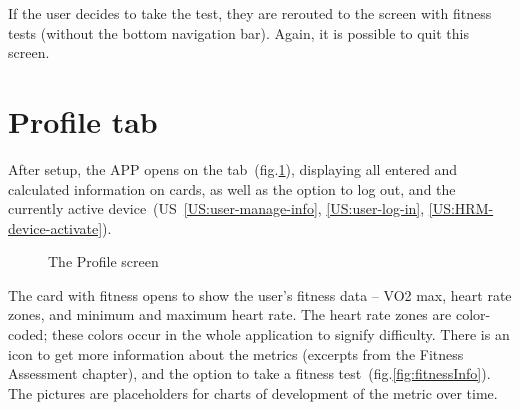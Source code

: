 If the user decides to take the test, they are rerouted to the screen with fitness tests (without the bottom navigation bar).
Again, it is possible to quit this screen.

\section{Profile tab}
After setup, the APP opens on the  tab~(fig.\ref{fig:profile1}), displaying all entered and calculated information on cards, as well as the option to log out, and the currently active device~(US~\ref{US:user-manage-info}, \ref{US:user-log-in}, \ref{US:HRM-device-activate}).

\begin{figure}[h!]
    \centering
    \hfill
    \caption{The Profile screen}
    \label{fig:profile1}
\end{figure}

The card with fitness opens to show the user's fitness data -- VO2 max, heart rate zones, and minimum and maximum heart rate.
The heart rate zones are color-coded; these colors occur in the whole application to signify difficulty.
There is an icon to get more information about the metrics (excerpts from the Fitness Assessment chapter), and the option to take a fitness test~(fig.\ref{fig:fitnessInfo}).
The pictures are placeholders for charts of development of the metric over time.

